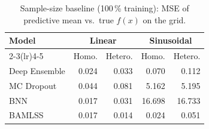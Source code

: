 
\begin{table}[htbp]
\centering
\small
\caption{Sample-size baseline (100\,\% training): MSE of predictive mean vs.\ true $f(x)$ on the grid.}
\begin{tabular}{l r r r r}
\toprule
\textbf{Model} & \multicolumn{2}{c}{Linear} & \multicolumn{2}{c}{Sinusoidal} \\
\cmidrule(lr){2-3}\cmidrule(lr){4-5}
& Homo. & Hetero. & Homo. & Hetero. \\
\midrule
Deep Ensemble & 0.024 & 0.033 & 0.070 & 0.112 \\
MC Dropout & 0.044 & 0.081 & 5.162 & 5.195 \\
BNN & 0.017 & 0.031 & 16.698 & 16.733 \\
BAMLSS & 0.017 & 0.014 & 0.024 & 0.051 \\
\bottomrule
\end{tabular}
\end{table}
